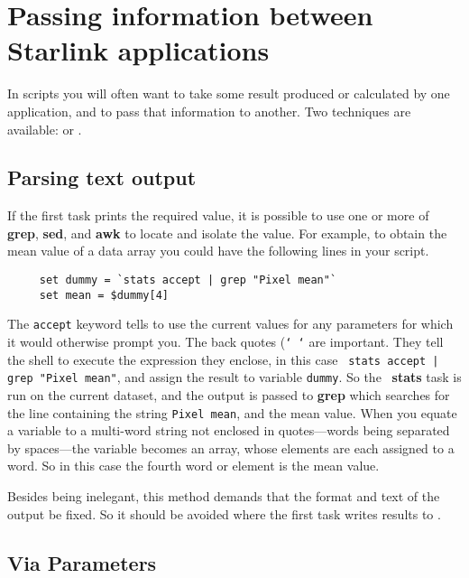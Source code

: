 \newpage
\section{Passing information between
Starlink applications\label{sc4_se_passing_info}}

In scripts you will often want to take some result produced or
calculated by one application, and to pass that information to another.
Two techniques are available:  or
.

\subsection{Parsing text output
\label{sc4_se_info_parse}}

If the first task prints the required value, it is possible to use one
or more of {\bf grep}, {\bf sed}, and {\bf awk} to locate and isolate
the value.  For example, to obtain the mean value of a data array you
could have the following lines in your script.

\small
\begin{verbatim}
     set dummy = `stats accept | grep "Pixel mean"`
     set mean = $dummy[4]
\end{verbatim}
\normalsize

The {\tt accept} keyword tells  to use
the current values for any parameters for which it would otherwise
prompt you.  The back quotes ({\tt `~`} are important.  They tell the
shell to execute the expression they enclose, in this case \mbox{{\tt
stats accept | grep "Pixel mean"}}, and assign the result to variable
{\tt dummy}. So the \KAPPAref\ {\bf stats} task is run on the current
dataset, and the output is passed to {\bf grep} which searches for the
line containing the string {\tt Pixel mean}, and the mean value.  When
you equate a variable to a multi-word string not enclosed in
quotes---words being separated by spaces---the variable becomes an
array, whose elements are each assigned to a word.  So in this case
the fourth word or element is the mean value.

Besides being inelegant, this method demands that the format and
text of the output be fixed.  So it should be avoided where the
first task writes results to .

\subsection{Via Parameters
\label{sc4_se_info_parameter}}

